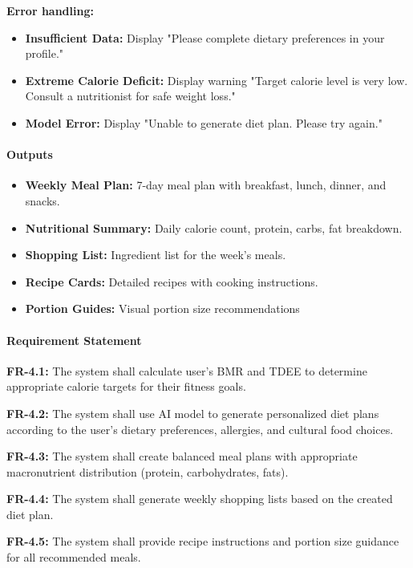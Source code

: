 \documentclass[12pt,a4paper]{article}
\begin{document}
\textbf{Error handling:}
\begin{itemize}
    \item \textbf{Insufficient Data:} Display "Please complete dietary preferences in your profile."
    \item \textbf{Extreme Calorie Deficit:} Display warning "Target calorie level is very low. Consult a nutritionist for safe weight loss."
    \item \textbf{Model Error:} Display "Unable to generate diet plan. Please try again."
\end{itemize}

\paragraph{Outputs}
\begin{itemize}
    \item \textbf{Weekly Meal Plan:} 7-day meal plan with breakfast, lunch, dinner, and snacks.
    \item \textbf{Nutritional Summary:} Daily calorie count, protein, carbs, fat breakdown.
    \item \textbf{Shopping List:} Ingredient list for the week's meals.
    \item \textbf{Recipe Cards:} Detailed recipes with cooking instructions.
    \item \textbf{Portion Guides:} Visual portion size recommendations
\end{itemize}

\paragraph{Requirement Statement}
\textbf{FR-4.1:} The system shall calculate user's BMR and TDEE to determine appropriate calorie targets for their fitness goals.

\textbf{FR-4.2:} The system shall use AI model to generate personalized diet plans according to the user's dietary preferences, allergies, and cultural food choices.

\textbf{FR-4.3:} The system shall create balanced meal plans with appropriate macronutrient distribution (protein, carbohydrates, fats).

\textbf{FR-4.4:} The system shall generate weekly shopping lists based on the created diet plan.

\textbf{FR-4.5:} The system shall provide recipe instructions and portion size guidance for all recommended meals.
\end{document}
